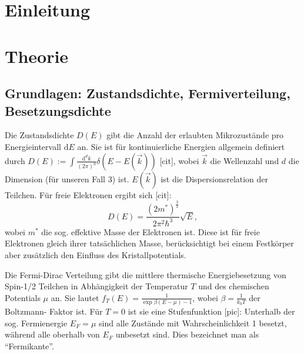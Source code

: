 \documentclass[twoside,        %
               BCOR12mm,       %
               english,ngerman, %
               fleqn,headsepline=false,footsepline=false
              ]{Vorlage/MFPREPORT}
\renewcommand{\d}{\ensuremath{\mathrm{d}}} %
\begin{document}
\date{\today}
\CopyNotWanted

\maketitle


\tableofcontents

\clearpage
{}

\section{Einleitung}
\label{sec:einleitung}
\section{Theorie}
\label{sec:theorie}
\subsection{Grundlagen: Zustandsdichte, Fermiverteilung, Besetzungsdichte}
Die Zustandsdichte $D(E)$ gibt die Anzahl der erlaubten Mikrozustände pro
Energieintervall $\d E$ an. Sie ist für kontinuierliche Energien allgemein
definiert durch $D(E):=\int \frac{\d^d k}{(2
\pi)^d}\delta\left(E-E(\vec{k})\right)$ [cit],
wobei $\vec k$ die Wellenzahl und $d$ die Dimension (für unseren Fall 3) ist.
$E(\vec k)$ ist die Dispersionsrelation der Teilchen.
Für freie Elektronen ergibt sich [cit]:
\begin{equation}
    \label{eq:freielek}
    D(E)=\frac{\left(2m^*\right)^\frac{3}{2}}{2\pi ^2\hbar ^3}\sqrt{E}, 
\end{equation}
wobei $m^*$ die sog. effektive Masse der Elektronen ist. Diese ist für freie
Elektronen gleich ihrer tatsächlichen Masse, berücksichtigt bei einem
Festkörper aber zusätzlich den Einfluss des Kristallpotentials.

Die Fermi-Dirac Verteilung gibt die mittlere thermische Energiebesetzung von Spin-1/2
Teilchen in Abhängigkeit der Temperatur $T$ und des chemischen Potentials $\mu$
an. Sie lautet $f_T(E)=\frac{1}{\exp{\beta(E-\mu)-1}}$, wobei
$\beta=\frac{1}{k_b T}$ der Boltzmann- Faktor ist. Für $T=0$ ist sie eine
Stufenfunktion [pic]: Unterhalb der sog. Fermienergie $E_F=\mu$ sind alle
Zustände mit Wahrscheinlichkeit 1 besetzt, während alle oberhalb von $E_F$
unbesetzt sind. Dies bezeichnet man als ``Fermikante''.
\end{document}
